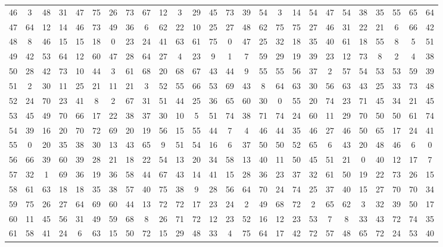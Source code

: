 \begin{table}
\begin{tabular}{c c c c c c c c c c c c c c c c c c c c c c c c c c }
46 & 3 & 48 & 31 & 47 & 75 & 26 & 73 & 67 & 12 & 3 & 29 & 45 & 73 & 39 & 54 & 3 & 14 & 54 & 47 & 54 & 38 & 35 & 55 & 65 & 64 \\
47 & 64 & 12 & 14 & 46 & 73 & 49 & 36 & 6 & 62 & 22 & 10 & 25 & 27 & 48 & 62 & 75 & 75 & 27 & 46 & 31 & 22 & 21 & 6 & 66 & 42 \\
48 & 8 & 46 & 15 & 15 & 18 & 0 & 23 & 24 & 41 & 63 & 61 & 75 & 0 & 47 & 25 & 32 & 18 & 35 & 40 & 61 & 18 & 55 & 8 & 5 & 51 \\
49 & 42 & 53 & 64 & 12 & 60 & 47 & 28 & 64 & 27 & 4 & 23 & 9 & 1 & 7 & 59 & 29 & 19 & 39 & 23 & 12 & 73 & 8 & 2 & 4 & 38 \\
50 & 28 & 42 & 73 & 10 & 44 & 3 & 61 & 68 & 20 & 68 & 67 & 43 & 44 & 9 & 55 & 55 & 56 & 37 & 2 & 57 & 54 & 53 & 53 & 59 & 39 \\
51 & 2 & 30 & 11 & 25 & 21 & 11 & 21 & 3 & 52 & 55 & 66 & 53 & 69 & 43 & 8 & 64 & 63 & 30 & 56 & 63 & 43 & 25 & 33 & 73 & 48 \\
52 & 24 & 70 & 23 & 41 & 8 & 2 & 67 & 31 & 51 & 44 & 25 & 36 & 65 & 60 & 30 & 0 & 55 & 20 & 74 & 23 & 71 & 45 & 34 & 21 & 45 \\
53 & 45 & 49 & 70 & 66 & 17 & 22 & 38 & 37 & 30 & 10 & 5 & 51 & 74 & 38 & 71 & 74 & 24 & 60 & 11 & 29 & 70 & 50 & 50 & 61 & 74 \\
54 & 39 & 16 & 20 & 70 & 72 & 69 & 20 & 19 & 56 & 15 & 55 & 44 & 7 & 4 & 46 & 44 & 35 & 46 & 27 & 46 & 50 & 65 & 17 & 24 & 41 \\
55 & 0 & 20 & 35 & 38 & 30 & 13 & 43 & 65 & 9 & 51 & 54 & 16 & 6 & 37 & 50 & 50 & 52 & 65 & 6 & 43 & 20 & 48 & 46 & 6 & 0 \\
56 & 66 & 39 & 60 & 39 & 28 & 21 & 18 & 22 & 54 & 13 & 20 & 34 & 58 & 13 & 40 & 11 & 50 & 45 & 51 & 21 & 0 & 40 & 12 & 17 & 7 \\
57 & 32 & 1 & 69 & 36 & 19 & 36 & 58 & 44 & 67 & 43 & 14 & 41 & 15 & 28 & 36 & 23 & 37 & 32 & 61 & 50 & 19 & 22 & 73 & 26 & 15 \\
58 & 61 & 63 & 18 & 18 & 35 & 38 & 57 & 40 & 75 & 38 & 9 & 28 & 56 & 64 & 70 & 24 & 74 & 25 & 37 & 40 & 15 & 27 & 70 & 70 & 34 \\
59 & 75 & 26 & 27 & 64 & 69 & 60 & 44 & 13 & 72 & 72 & 17 & 23 & 24 & 2 & 49 & 68 & 72 & 2 & 65 & 62 & 3 & 32 & 39 & 50 & 17 \\
60 & 11 & 45 & 56 & 31 & 49 & 59 & 68 & 8 & 26 & 71 & 72 & 12 & 23 & 52 & 16 & 12 & 23 & 53 & 7 & 8 & 33 & 43 & 72 & 74 & 35 \\
61 & 58 & 41 & 24 & 6 & 63 & 15 & 50 & 72 & 15 & 29 & 48 & 33 & 4 & 75 & 64 & 17 & 42 & 72 & 57 & 48 & 65 & 72 & 24 & 53 & 40 \\

\end{tabular}
\end{table}
